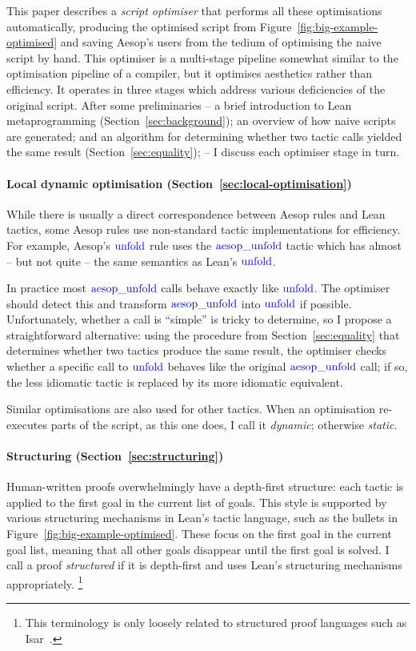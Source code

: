 \documentclass[sigplan,10pt,anonymous,review]{acmart}
\newcommand{\tac}[1]{\ensuremath{\mathrm{\mathcolor{blue}{#1}}}}
\begin{document}
This paper describes a \emph{script optimiser} that performs all these optimisations automatically, producing the optimised script from Figure~\ref{fig:big-example-optimised} and saving Aesop's users from the tedium of optimising the naive script by hand.
This optimiser is a multi-stage pipeline somewhat similar to the optimisation pipeline of a compiler, but it optimises aesthetics rather than efficiency.
It operates in three stages which address various deficiencies of the original script.
After some preliminaries -- a brief introduction to Lean metaprogramming (Section~\ref{sec:background}); an overview of how naive scripts are generated; and an algorithm for determining whether two tactic calls yielded the same result (Section~\ref{sec:equality}); -- I discuss each optimiser stage in turn.

\paragraph{Local dynamic optimisation (Section~\ref{sec:local-optimisation})}
While there is usually a direct correspondence between Aesop rules and Lean tactics, some Aesop rules use non-standard tactic implementations for efficiency.
For example, Aesop's \tac{unfold} rule uses the \tac{aesop\_unfold} tactic which has almost -- but not quite -- the same semantics as Lean's \tac{unfold}.

In practice most \tac{aesop\_unfold} calls behave exactly like \tac{unfold}.
The optimiser should detect this and transform \tac{aesop\_unfold} into \tac{unfold} if possible.
Unfortunately, whether a call is \enquote{simple} is tricky to determine, so I propose a straightforward alternative:
using the procedure from Section~\ref{sec:equality} that determines whether two tactics produce the same result, the optimiser checks whether a specific call to \tac{unfold} behaves like the original \tac{aesop\_unfold} call; if so, the less idiomatic tactic is replaced by its more idiomatic equivalent.

Similar optimisations are also used for other tactics.
When an optimisation re-executes parts of the script, as this one does, I call it \emph{dynamic}; otherwise \emph{static}.

\paragraph{Structuring (Section~\ref{sec:structuring})}
Human-written proofs overwhelmingly have a depth-first structure: each tactic is applied to the first goal in the current list of goals.
This style is supported by various structuring mechanisms in Lean's tactic language, such as the bullets in Figure~\ref{fig:big-example-optimised}.
These focus on the first goal in the current goal list, meaning that all other goals disappear until the first goal is solved.
I call a proof \emph{structured} if it is depth-first and uses Lean's structuring mechanisms appropriately.%
\footnote{This terminology is only loosely related to structured proof languages such as Isar~\cite{Isar}.}
\end{document}
